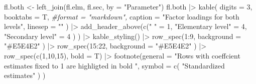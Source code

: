 \documentclass[
]{article}
\newenvironment{Shaded}{\begin{snugshade}}{\end{snugshade}}
\newcommand{\AttributeTok}[1]{\textcolor[rgb]{0.77,0.63,0.00}{#1}}
\newcommand{\CommentTok}[1]{\textcolor[rgb]{0.56,0.35,0.01}{\textit{#1}}}
\newcommand{\DecValTok}[1]{\textcolor[rgb]{0.00,0.00,0.81}{#1}}
\newcommand{\FunctionTok}[1]{\textcolor[rgb]{0.00,0.00,0.00}{#1}}
\newcommand{\NormalTok}[1]{#1}
\newcommand{\OtherTok}[1]{\textcolor[rgb]{0.56,0.35,0.01}{#1}}
\newcommand{\SpecialCharTok}[1]{\textcolor[rgb]{0.00,0.00,0.00}{#1}}
\newcommand{\StringTok}[1]{\textcolor[rgb]{0.31,0.60,0.02}{#1}}
\begin{document}
\begin{Shaded}
\begin{Highlighting}[]
\NormalTok{fl.both }\OtherTok{\textless{}{-}} \FunctionTok{left\_join}\NormalTok{(fl.elm, }
\NormalTok{                     fl.sec, }
                     \AttributeTok{by =} \StringTok{"Parameter"}\NormalTok{)}
\NormalTok{fl.both }\SpecialCharTok{|\textgreater{}} 
  \FunctionTok{kable}\NormalTok{(}
    \AttributeTok{digits =} \DecValTok{3}\NormalTok{,}
    \AttributeTok{booktabs =}\NormalTok{ T,}
    \CommentTok{\#format = "markdown",}
    \AttributeTok{caption =} \StringTok{"Factor loadings for both levels"}\NormalTok{,}
    \AttributeTok{linesep =} \StringTok{""}
\NormalTok{    ) }\SpecialCharTok{|\textgreater{}}  
  \FunctionTok{add\_header\_above}\NormalTok{(}\FunctionTok{c}\NormalTok{(}\StringTok{" "} \OtherTok{=} \DecValTok{1}\NormalTok{, }
                     \StringTok{"Elementary level"} \OtherTok{=} \DecValTok{4}\NormalTok{,}
                     \StringTok{"Secondary level"} \OtherTok{=} \DecValTok{4}
\NormalTok{                     )}
\NormalTok{                   ) }\SpecialCharTok{|\textgreater{}} 
  \FunctionTok{kable\_styling}\NormalTok{() }\SpecialCharTok{|\textgreater{}} 
  \FunctionTok{row\_spec}\NormalTok{(}\DecValTok{1}\SpecialCharTok{:}\DecValTok{9}\NormalTok{, }
           \AttributeTok{background =} \StringTok{"\#E5E4E2"}
\NormalTok{           ) }\SpecialCharTok{|\textgreater{}} 
  \FunctionTok{row\_spec}\NormalTok{(}\DecValTok{15}\SpecialCharTok{:}\DecValTok{22}\NormalTok{, }
           \AttributeTok{background =} \StringTok{"\#E5E4E2"}
\NormalTok{           ) }\SpecialCharTok{|\textgreater{}} 
  \FunctionTok{row\_spec}\NormalTok{(}\FunctionTok{c}\NormalTok{(}\DecValTok{1}\NormalTok{,}\DecValTok{10}\NormalTok{,}\DecValTok{15}\NormalTok{), }\AttributeTok{bold =}\NormalTok{ T) }\SpecialCharTok{|\textgreater{}} 
  \FunctionTok{footnote}\NormalTok{(}\AttributeTok{general =} 
             \StringTok{"Rows with coeffcient estimates fixed to 1 are highligted in bold "}\NormalTok{,}
           \AttributeTok{symbol =} \FunctionTok{c}\NormalTok{(}
             \StringTok{"Standardized estimates"}
\NormalTok{                      )}
\NormalTok{           )}
\end{Highlighting}
\end{Shaded}
\end{document}
